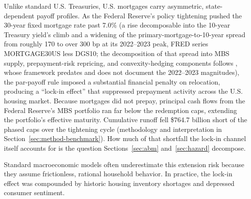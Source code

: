 \documentclass[12pt]{article}
\begin{document}
Unlike standard U.S. Treasuries, U.S. mortgages carry asymmetric, state-dependent payoff profiles. As the Federal Reserve's policy tightening pushed the 30-year fixed mortgage rate past 7.0\% (a rise decomposable into the 10-year Treasury yield's climb and a widening of the primary-mortgage-to-10-year spread from roughly 170 to over 300 bp at its 2022--2023 peak, FRED series MORTGAGE30US less DGS10; the decomposition of that spread into MBS supply, prepayment-risk repricing, and convexity-hedging components follows \citet{boyarchenko2019}, whose framework predates and does not document the 2022--2023 magnitudes), the par-payoff rule imposed a substantial financial penalty on relocation, producing a ``lock-in effect'' that suppressed prepayment activity across the U.S. housing market. Because mortgages did not prepay, principal cash flows from the Federal Reserve's MBS portfolio ran far below the redemption caps, extending the portfolio's effective maturity. Cumulative runoff fell \$764.7 billion short of the phased caps over the tightening cycle (methodology and interpretation in Section~\ref{sec:method-benchmark}). How much of that shortfall the lock-in channel itself accounts for is the question Sections~\ref{sec:abm} and~\ref{sec:hazard} decompose.

Standard macroeconomic models often underestimate this extension risk because they assume frictionless, rational household behavior. In practice, the lock-in effect was compounded by historic housing inventory shortages and depressed consumer sentiment.
\end{document}
